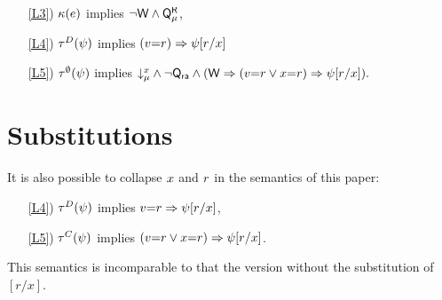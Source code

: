 \noindent
\begin{enumerate}
\item[\ref{L3})] $\kappa(e)$ implies
  \begin{math}
    \lnot\mathsf{W}
    \land \smash{\mathsf{Q}_{\mu}^{\mathsf{R}}}
  \end{math},
\item[\ref{L4})]
  $\aTr{\bEvs}{\bForm}$ implies
  \begin{math}
    (v{=}r)
    \Rightarrow \psi[r/{x}]
  \end{math}
\item[\ref{L5})] 
  $\aTr{\emptyset}{\bForm}$ implies
  \begin{math}
    \mathord{\downarrow^{x}_{\mu}}
    \land \lnot\mathsf{Q}_{{\mathsf{ra}}}
    \land
    (\mathsf{W}
    \Rightarrow (v{=}r\lor x{=}r) 
    \Rightarrow \psi[r/{x}]
    ).
  \end{math}
\end{enumerate}  

\section{Substitutions}

It is also possible to collapse $x$ and $r$ in the semantics of
this paper:
\begin{enumerate}
\item[\ref{L4})]
  $\aTr{\bEvs}{\bForm}$ implies $v{=}r\Rightarrow\psi[r/x]$, 
\item[\ref{L5})]
  $\aTr{\cEvs}{\bForm}$ implies
  $(v{=}r\lor x{=}r)\Rightarrow\psi[r/x]$. %
\end{enumerate}
This semantics is incomparable to that the version without the substitution
of $[r/x]$.

